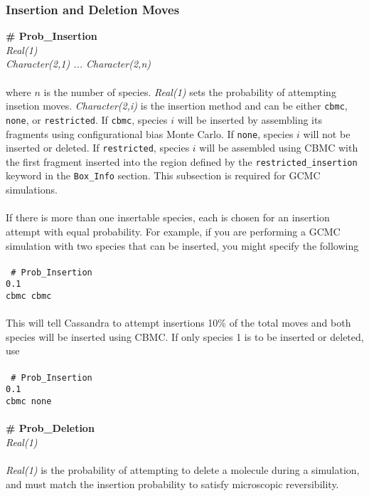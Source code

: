 \subsubsection{Insertion and Deletion Moves}
{\bf \# Prob\_Insertion} \\
{\it Real(1)} \\
{\it Character(2,1) ... Character(2,n)} \\ \\
%
where $n$ is the number of species. 
{\it Real(1)} sets the probability of attempting insetion moves. 
{\it Character(2,i)} is the insertion method and can be either 
\texttt{cbmc}, \texttt{none}, or \texttt{restricted}.
If \texttt{cbmc}, species $i$ will be inserted by assembling its 
fragments using configurational bias Monte Carlo.
If \texttt{none}, species $i$ will not be inserted or deleted.
If \texttt{restricted}, species $i$ will be assembled using CBMC
with the first fragment inserted into the region defined by 
the \texttt{restricted\_insertion} keyword in the \texttt{Box\_Info} section.
This subsection is required for GCMC simulations. \\ \\
%
If there is more than one insertable species, each is chosen for an insertion attempt with equal probability. 
For example, if you are performing a GCMC simulation with two species that can 
be inserted, you might specify the following \\ \\ 
%
\texttt{
\# Prob\_Insertion \\
0.1 \\
cbmc cbmc} \\ \\ 
%
This will tell Cassandra to attempt insertions 10\% of the total moves and
both species will be inserted using CBMC.
If only species 1 is to be inserted or deleted, use \\ \\
%
\texttt{
\# Prob\_Insertion \\
0.1 \\
cbmc none} \\ \\ 
%
%
%
{\bf \# Prob\_Deletion} \\
{\it Real(1)} \\ \\
%
{\it Real(1)} is the probability of attempting to delete a molecule during a simulation, 
and must match the insertion probability to satisfy microscopic reversibility.
